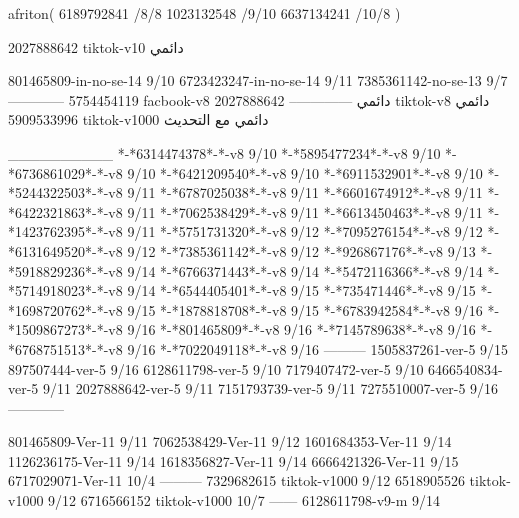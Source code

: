 afriton(
6189792841 /8/8
1023132548 /9/10
6637134241 /10/8
)

2027888642 tiktok-v10
دائمي


801465809-in-no-se-14 9/10
6723423247-in-no-se-14 9/11
7385361142-no-se-13
9/7
------------
5754454119 facbook-v8
دائمي
--------------
2027888642 tiktok-v8
دائمي
5909533996 tiktok-v1000
دائمي مع التحديث

__________
*-*6314474378*-*-v8 9/10
*-*5895477234*-*-v8 9/10
*-*6736861029*-*-v8 9/10
*-*6421209540*-*-v8 9/10
*-*6911532901*-*-v8 9/10
*-*5244322503*-*-v8 9/11
*-*6787025038*-*-v8 9/11
*-*6601674912*-*-v8 9/11
*-*6422321863*-*-v8 9/11
*-*7062538429*-*-v8 9/11
*-*6613450463*-*-v8 9/11
*-*1423762395*-*-v8 9/11
*-*5751731320*-*-v8 9/12
*-*7095276154*-*-v8 9/12
*-*6131649520*-*-v8 9/12
*-*7385361142*-*-v8 9/12
*-*926867176*-*-v8 9/13
*-*5918829236*-*-v8 9/14
*-*6766371443*-*-v8 9/14
*-*5472116366*-*-v8 9/14
*-*5714918023*-*-v8 9/14
*-*6544405401*-*-v8 9/15
*-*735471446*-*-v8 9/15
*-*1698720762*-*-v8 9/15
*-*1878818708*-*-v8 9/15
*-*6783942584*-*-v8 9/16
*-*1509867273*-*-v8 9/16
*-*801465809*-*-v8 9/16
*-*7145789638*-*-v8 9/16
*-*6768751513*-*-v8 9/16
*-*7022049118*-*-v8 9/16
---------
1505837261-ver-5 9/15
897507444-ver-5 9/16
6128611798-ver-5 9/10
7179407472-ver-5 9/10
6466540834-ver-5 9/11
2027888642-ver-5 9/11
7151793739-ver-5 9/11
7275510007-ver-5 9/16
------------



801465809-Ver-11
9/11
7062538429-Ver-11
9/12
1601684353-Ver-11
9/14
1126236175-Ver-11
9/14
1618356827-Ver-11
9/14
6666421326-Ver-11
9/15
6717029071-Ver-11
10/4
---------
7329682615 tiktok-v1000
9/12
6518905526 tiktok-v1000
9/12
6716566152 tiktok-v1000
10/7
------
6128611798-v9-m
9/14
